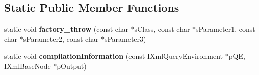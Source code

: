 \subsection*{\-Static \-Public \-Member \-Functions}
\begin{DoxyCompactItemize}
\item 
\hypertarget{classgeneral__server_1_1ExceptionBase_a8df8baa4f43ea58e92e34f22f25ae00e}{static void {\bfseries factory\-\_\-throw} (const char $\ast$s\-Class, const char $\ast$s\-Parameter1, const char $\ast$s\-Parameter2, const char $\ast$s\-Parameter3)}\label{classgeneral__server_1_1ExceptionBase_a8df8baa4f43ea58e92e34f22f25ae00e}

\item 
\hypertarget{classgeneral__server_1_1ExceptionBase_ad16b262454746a402ec6439989c87fef}{static void {\bfseries compilation\-Information} (const \-I\-Xml\-Query\-Environment $\ast$p\-Q\-E, \-I\-Xml\-Base\-Node $\ast$p\-Output)}\label{classgeneral__server_1_1ExceptionBase_ad16b262454746a402ec6439989c87fef}

\end{DoxyCompactItemize}

